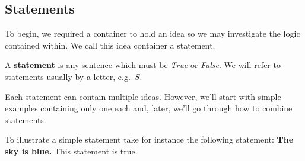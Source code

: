 \subsection{Statements}

To begin, we required a container to hold an idea so we may investigate the logic contained within.
We call this idea container a statement.

\begin{defn}
\label{defn:statement}
  A \textbf{statement} is any sentence which must be \emph{True} or \emph{False}.
  We will refer to statements usually by a letter, e.g.\ $S$.
\end{defn}

Each statement can contain multiple ideas.
However, we'll start with simple examples containing only one each and, later, we'll go through how to combine statements.

\begin{ex}
  To illustrate a simple statement take for instance the following statement:
  \textbf{The sky is blue.}
  This statement is true.
\end{ex}
